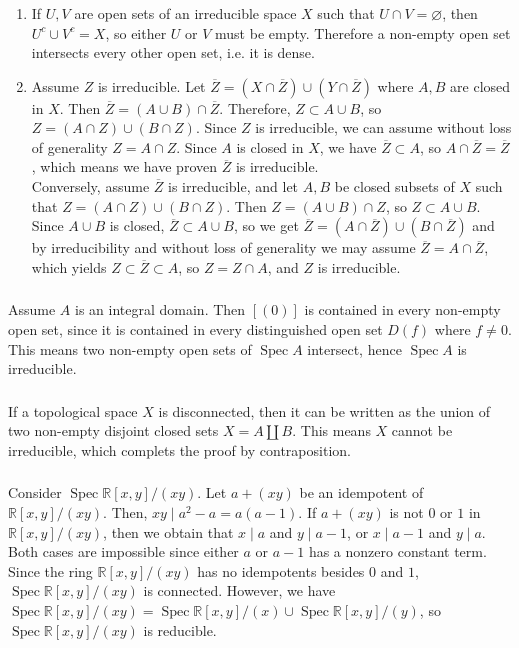 \documentclass{article}
\newcommand{\R}{\mathbb{R}}
\DeclareMathOperator{\Spec}{Spec}
\newcommand{\exercise}{\subsubsection} %
\begin{document}
\exercise{} \begin{enumerate}
    \item If $U,V$ are open sets of an irreducible space $X$ such that $U \cap V = \varnothing$, then $U^c \cup V^c = X$, so either $U$ or $V$ must be empty. Therefore a non-empty open set intersects every other open set, i.e. it is dense.
    \item Assume $Z$ is irreducible. Let $\overline{Z} = (X\cap \overline{Z}) \cup (Y\cap \overline{Z})$ where $A,B$ are closed in $X$. Then $\overline{Z} = (A \cup B) \cap \overline{Z}$. Therefore, $Z \subset A \cup B$, so $Z = (A \cap Z) \cup (B \cap Z)$. Since $Z$ is irreducible, we can assume without loss of generality $Z = A \cap Z$. Since $A$ is closed in $X$, we have $\overline{Z} \subset A$, so $A \cap \overline{Z} = \overline{Z}$, which means we have proven $\overline{Z}$ is irreducible. \\
    Conversely, assume $\overline{Z}$ is irreducible, and let $A,B$ be closed subsets of $X$ such that $Z = (A \cap Z) \cup (B \cap Z)$. Then $Z = (A \cup B) \cap Z$, so $Z \subset A \cup B$. Since $A \cup B$ is closed, $\overline{Z} \subset A \cup B$, so we get $\overline{Z} = (A \cap \overline{Z}) \cup (B \cap \overline{Z})$ and by irreducibility and without loss of generality we may assume $\overline{Z} = A \cap \overline{Z}$, which yields $Z \subset \overline{Z} \subset A$, so $Z = Z \cap A$, and $Z$ is irreducible.
\end{enumerate}

\exercise{} Assume $A$ is an integral domain. Then $[(0)]$ is contained in every non-empty open set, since it is contained in every distinguished open set $D(f)$ where $f \ne 0$. This means two non-empty open sets of $\Spec A$ intersect, hence $\Spec A$ is irreducible.

\exercise{} If a topological space $X$ is disconnected, then it can be written as the union of two non-empty disjoint closed sets $X = A \coprod B$. This means $X$ cannot be irreducible, which complets the proof by contraposition.

\exercise{} Consider $\Spec \R[x,y]/(xy)$. Let $a + (xy)$ be an idempotent of $\R[x,y]/(xy)$. Then, $xy \mid a^2 - a = a(a-1)$. If $a + (xy)$ is not $0$ or $1$ in $\R[x,y]/(xy)$, then we obtain that $x \mid a$ and $y \mid a-1$, or $x \mid a-1$ and $y \mid a$. Both cases are impossible since either $a$ or $a-1$ has a nonzero constant term. Since the ring $\R[x,y]/(xy)$ has no idempotents besides $0$ and $1$, $\Spec \R[x,y]/(xy)$ is connected. However, we have $\Spec \R[x,y]/(xy) = \Spec \R[x,y]/(x) \cup \Spec \R[x,y]/(y)$, so $\Spec \R[x,y]/(xy)$ is reducible.
\end{document}
